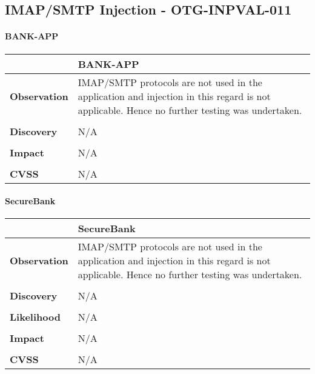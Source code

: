 \subsection{IMAP/SMTP Injection - OTG-INPVAL-011}
\paragraph{BANK-APP} \mbox{}
\begin{longtable*}{p{.20\textwidth} | p{.80\textwidth}}
	\hline
	& \textbf{BANK-APP} \\
	\hline
	\textbf{Observation} &
	IMAP/SMTP protocols are not used in the application and injection in this regard is not applicable. Hence no further testing was undertaken.
	\\\\
	\textbf{Discovery} &
	N/A
	\\\\
	\textbf{Impact} &
	N/A
	\\\\
	\textbf{CVSS} &
	N/A
	\\
	\hline
\end{longtable*}
\paragraph{SecureBank} \mbox{}
\begin{longtable*}{p{.20\textwidth} | p{.80\textwidth}}
	\hline
	& \textbf{SecureBank} \\
	\hline
	\textbf{Observation} &
	IMAP/SMTP protocols are not used in the application and injection in this regard is not applicable. Hence no further testing was undertaken.
	\\\\
	\textbf{Discovery} &
	N/A
	\\\\
	\textbf{Likelihood} &
	N/A
	\\\\
	\textbf{Impact} &
	N/A
	\\\\
	\textbf{CVSS} &
	N/A
	\\
	\hline
\end{longtable*}
\clearpage